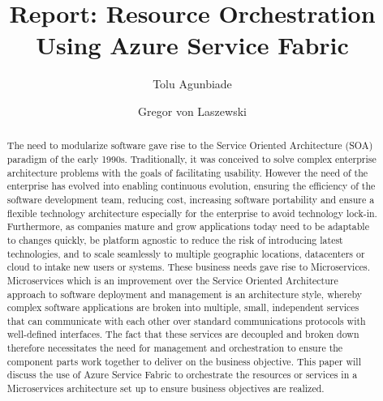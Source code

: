 
\title{Report: Resource Orchestration Using Azure Service Fabric }


\author{Tolu Agunbiade}

\author{Gregor von Laszewski}


\renewcommand{\shortauthors}{G. v. Laszewski}


\begin{abstract}
The need to modularize software gave rise to the Service Oriented
Architecture (SOA) paradigm of the early 1990s. Traditionally, 
it was
conceived to solve complex enterprise architecture problems with the
goals of facilitating usability. However the need of the enterprise
has evolved into enabling continuous evolution, ensuring the
efficiency of the software development team, reducing cost, increasing
software portability and ensure a flexible technology architecture
especially for the enterprise to avoid technology
lock-in. Furthermore, as companies mature and grow applications today
need to be adaptable to changes quickly, be platform agnostic to
reduce the risk of introducing latest technologies, and to scale
seamlessly to multiple geographic locations, datacenters or cloud to
intake new users or systems. These business needs gave rise to
Microservices. Microservices which is an improvement over the Service
Oriented Architecture approach to software deployment and management
is an architecture style, whereby complex software applications are
broken into multiple, small, independent services that can communicate
with each other over standard communications protocols with
well-defined interfaces. The fact that these services are decoupled
and broken down therefore necessitates the need for management and
orchestration to ensure the component parts work together to deliver
on the business objective. This paper will discuss the use of Azure
Service Fabric to orchestrate the resources or services in a
Microservices architecture set up to ensure business objectives are
realized.

\end{abstract}



